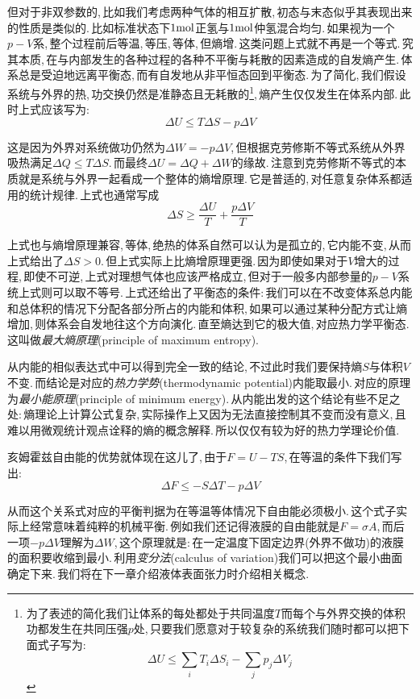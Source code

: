 但对于非双参数的,\,比如我们考虑两种气体的相互扩散,\,初态与末态似乎其表现出来的性质是类似的.\,比如标准状态下$1{\rm mol}$正氢与$1{\rm mol}$仲氢混合均匀.\,如果视为一个$p-V$系,\,整个过程前后等温,\,等压,\,等体,\,但熵增.\,这类问题上式就不再是一个等式.\,究其本质,\,在与内部发生的各种过程的各种不平衡与耗散的因素造成的自发熵产生.\,体系总是受迫地远离平衡态,\,而有自发地从非平恒态回到平衡态.\,为了简化,\,我们假设系统与外界的热,\,功交换仍然是准静态且无耗散的\footnote{为了表述的简化我们让体系的每处都处于共同温度$T$而每个与外界交换的体积功都发生在共同压强$p$处,\,只要我们愿意对于较复杂的系统我们随时都可以把下面式子写为:\[\Delta U \leq \sum_i T_i\Delta S_i -\sum_j p_j\Delta V_j\]},\,熵产生仅仅发生在体系内部.\,此时上式应该写为:
\[\Delta U \leq T\Delta S -p\Delta V\]

这是因为外界对系统做功仍然为$\Delta W=-p\Delta V$,\,但根据克劳修斯不等式系统从外界吸热满足$\Delta Q\leq T\Delta S$.\,而最终$\Delta U=\Delta Q+\Delta W$的缘故.\,注意到克劳修斯不等式的本质就是系统与外界一起看成一个整体的熵增原理.\,它是普适的,\,对任意复杂体系都适用的统计规律.\,上式也通常写成
\[\Delta S\geq \frac{\Delta U}{T}+\frac{p\Delta V}{T}\]

上式也与熵增原理兼容,\,等体,\,绝热的体系自然可以认为是孤立的,\,它内能不变,\,从而上式给出了$\Delta S>0$.\,但上式实际上比熵增原理更强.\,因为即使如果对于$V$增大的过程,\,即使不可逆,\,上式对理想气体也应该严格成立,\,但对于一般多内部参量的$p-V$系统上式则可以取不等号.\,上式还给出了平衡态的条件:\,我们可以在不改变体系总内能和总体积的情况下分配各部分所占的内能和体积,\,如果可以通过某种分配方式让熵增加,\,则体系会自发地往这个方向演化.\,直至熵达到它的极大值,\,对应热力学平衡态.\,这叫做\emph{最大熵原理}(principle of maximum entropy).

从内能的相似表达式中可以得到完全一致的结论,\,不过此时我们要保持熵$S$与体积$V$不变.\,而结论是对应的\emph{热力学势}(thermodynamic potential)\ca 内能取最小.\,对应的原理为\emph{最小能原理}(principle of minimum energy).\,从内能出发的这个结论有些不足之处:\,熵理论上计算公式复杂,\,实际操作上又因为无法直接控制其不变而没有意义,\,且难以用微观统计观点诠释的熵的概念解释.\,所以仅仅有较为好的热力学理论价值.

亥姆霍兹自由能的优势就体现在这儿了,\,由于$F=U-TS$,\,在等温的条件下我们写出:
\[\Delta F\leq-S\Delta T-p\Delta V\]

从而这个关系式对应的平衡判据为\ca 在等温等体情况下自由能必须极小.\,这个式子实际上经常意味着纯粹的机械平衡.\,例如我们还记得液膜的自由能就是$F=\sigma A$,\,而后一项$-p\Delta V$理解为$\Delta W$,\,这个原理就是:\,在一定温度下固定边界(外界不做功)的液膜的面积要收缩到最小.\,利用\emph{变分法}(calculus of variation)我们可以把这个最小曲面确定下来.\,我们将在下一章介绍液体表面张力时介绍相关概念.

